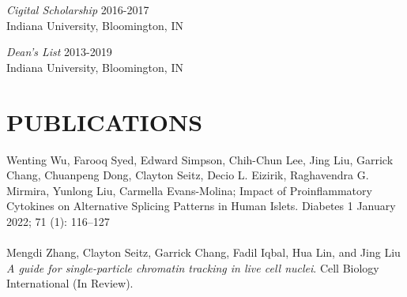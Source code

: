 \documentclass[margin, 10pt]{res} %
\begin{document}
\begin{resume}
{\sl Cigital Scholarship} \hfill 2016-2017 \\
Indiana University, Bloomington, IN 

{\sl Dean’s List} \hfill 2013-2019 \\
Indiana University, Bloomington, IN 

\section{PUBLICATIONS}

Wenting Wu, Farooq Syed, Edward Simpson, Chih-Chun Lee, Jing Liu, Garrick Chang, Chuanpeng Dong, Clayton Seitz, Decio L. Eizirik, Raghavendra G. Mirmira, Yunlong Liu, Carmella Evans-Molina; Impact of Proinflammatory Cytokines on Alternative Splicing Patterns in Human Islets. Diabetes 1 January 2022; 71 (1): 116–127
\\
\\
Mengdi Zhang, Clayton Seitz, Garrick Chang, Fadil Iqbal, Hua Lin, and Jing Liu \textit{A guide for single-particle chromatin tracking in live cell nuclei}. Cell Biology International (In Review).

\end{resume}
\end{document}

